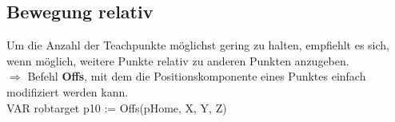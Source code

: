 \subsection{Bewegung relativ}
Um die Anzahl der Teachpunkte möglichst gering zu halten, empfiehlt es sich, wenn möglich, weitere Punkte relativ zu anderen Punkten anzugeben. \\
$\Rightarrow$ Befehl \textbf{Offs}, mit dem die Positionskomponente eines Punktes einfach modifiziert werden kann.\\
VAR robtarget p10 := Offs(pHome, X, Y, Z)

